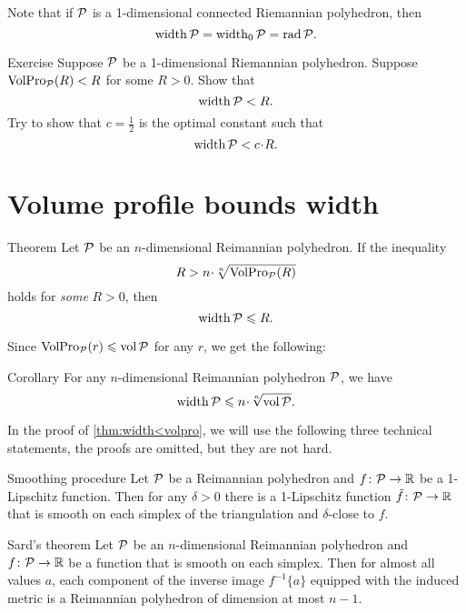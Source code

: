 Note that if $\mathcal{P}$ is a 1-dimensional connected Riemannian polyhedron, then 
\[\operatorname{\rm width}\nolimits\mathcal{P}=\operatorname{\rm width}\nolimits_0\mathcal{P}=\mathop{\rm rad}\nolimits\mathcal{P}.\]

\begin{thm}{Exercise}\label{ex:1D-case}
Suppose $\mathcal{P}$ be a 1-dimensional Riemannian polyhedron.
Suppose $\operatorname{\rm VolPro}\nolimits_{\mathcal{P}}(R)<R$ for some $R>0$.
Show that 
\[\operatorname{\rm width}\nolimits \mathcal{P}<R.\]
Try to show that $c=\tfrac 12$ is the optimal constant such that 
\[\width \spc{P}<c\cdot R.\]
\end{thm}

\section{Volume profile bounds width}

\begin{thm}{Theorem}\label{thm:width<volpro}
Let $\mathcal{P}$ be an $n$-dimensional Reimannian polyhedron. 
If the inequality 
\[R> n\cdot \sqrt[n]{\VolPro_{\spc{P}}(R)}\]
holds for {}\emph{some} $R>0$, then 
\[\operatorname{\rm width}\nolimits\mathcal{P}\leqslant  R.\]
\end{thm}

Since $\operatorname{\rm VolPro}\nolimits_{\mathcal{P}}(r)\leqslant \operatorname{\rm vol}\nolimits\mathcal{P}$ for any $r$,
we get the following:

\begin{thm}{Corollary}\label{thm:width<vol}
For any $n$-dimensional Reimannian polyhedron $\mathcal{P}$, we have
\[\width\spc{P}\le n\cdot \sqrt[n]{\vol\spc{P}}.\]

\end{thm}

In the proof of \ref{thm:width<volpro}, we will use the following three technical statements,
the proofs are omitted, but they are not hard. 

\begin{thm}{Smoothing procedure}
Let $\mathcal{P}$ be a Reimannian polyhedron and $f\colon\mathcal{P}\to \mathbb{R}$ be a 1-Lipschitz function.
Then for any $\delta>0$ there is a  1-Lipschitz function $\tilde f\colon\mathcal{P}\to \mathbb{R}$ that is smooth on each simplex of the triangulation and $\delta$-close to $f$.
\end{thm}

\begin{thm}{Sard's theorem}
Let $\mathcal{P}$ be an $n$-dimensional Reimannian polyhedron and $f\colon\mathcal{P}\to \mathbb{R}$ be a function that is smooth on each simplex.
Then for almost all values $a$, each component of the inverse image $f^{-1}\{a\}$ equipped with the induced metric is a Reimannian polyhedron of dimension at most $n-1$.
\end{thm}


